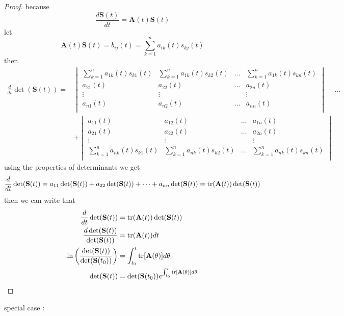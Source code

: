 \documentclass[]{article}
\begin{document}
\begin{proof}[Proof]
    because
    \[
        \frac{d\mathbf{S}(t)}{dt} = \mathbf{A}(t)\mathbf{S}(t)
    \]
    let 
    \[
        \mathbf{A}(t)\mathbf{S}(t) = b_{ij}(t) = \sum_{k=1}^{n} a_{ik}(t)s_{kj}(t)
    \]  
    then 
    \begin{align*}
        \frac{d}{dt} \det(\mathbf{S}(t))
        =&
        \begin{vmatrix}
            \sum_{k=1}^{n} a_{1k}(t)s_{k1}(t) & \sum_{k=1}^{n} a_{1k}(t)s_{k2}(t) & \dots & \sum_{k=1}^{n} a_{1k}(t)s_{kn}(t)\\
            a_{21}(t) & a_{22}(t) & \dots & a_{2n}(t)\\
            \vdots &\vdots & &\vdots \\
            a_{n1}(t) & a_{n2}(t) & \dots & a_{nn}(t)\\
        \end{vmatrix}
        +
        \dots
        \\
        &+
        \begin{vmatrix}
            a_{11}(t) & a_{12}(t) & \dots & a_{1n}(t)\\
            a_{21}(t) & a_{22}(t) & \dots & a_{2n}(t)\\
            \vdots &\vdots & &\vdots \\
            \sum_{k=1}^{n} a_{nk}(t)s_{k1}(t) & \sum_{k=1}^{n} a_{nk}(t)s_{k2}(t) & \dots & \sum_{k=1}^{n} a_{nk}(t)s_{kn}(t)\\
        \end{vmatrix} 
    \end{align*}
using the properties of determinants we get 
\[
    \frac{d}{dt} \det(\mathbf{S}(t)) = a_{11}\det(\mathbf{S}(t)) + a_{22}\det(\mathbf{S}(t)) +\dots+a_{nn}\det(\mathbf{S}(t)) = \trace(\mathbf{A}(t))\det(\mathbf{S}(t))
\]
then we can write that 
\begin{align*}
    \frac{d}{dt} \det(\mathbf{S}(t)) &= \trace(\mathbf{A}(t))\det(\mathbf{S}(t))
    \\
    \frac{d \det(\mathbf{S}(t))}{\det(\mathbf{S}(t))} &= \trace(\mathbf{A}(t)) dt
    \\
    \ln \left( \frac{\det(\mathbf{S}(t))}{\det(\mathbf{S}(t_0))} \right)&= \int_{t_0}^{t}\trace[\mathbf{A}(\theta)]d\theta
    \\
    \det(\mathbf{S}(t)) &= \det(\mathbf{S}(t_0))e^{\int_{t_0}^{t}\trace[\mathbf{A}(\theta)]d\theta}
\end{align*}
\end{proof}
special case :
\end{document}
